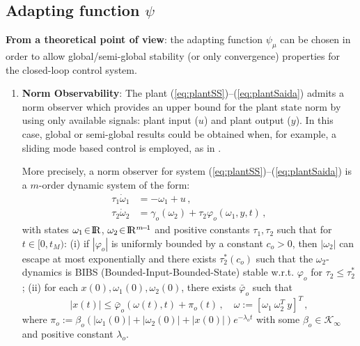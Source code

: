 \documentclass[letterpaper, 10 pt, conference]{ieeeconf}  %
\def\re{{\rm I}\! {\rm R}}
\theoremstyle{plain}
\theoremstyle{definition}
\theoremstyle{remark}
\begin{document}
\begin{footnotesize}
			\subsection{Adapting function $\psi$}
				{\bf From a theoretical point of view}: the adapting function $\psi_\mu$ can be chosen in order to allow global/semi-global stability (or only convergence) properties for the closed-loop control system.			
				\begin{enumerate}
				
				\item {\bf Norm Observability}: The plant
				(\ref{eq:plantSS})--(\ref{eq:plantSaida}) admits a norm observer which provides an upper bound for the plant state norm by using only  available signals: plant input ($u$) and plant output ($y$). In this case, global or semi-global results could be obtained when, for example, a sliding mode based control is employed, as in \cite{POH:2011}.  
				
				
				More precisely, a norm observer for system
				(\ref{eq:plantSS})--(\ref{eq:plantSaida})  is a $m$-order
				dynamic system of the form:
				\begin{align}
				\tau_1 \dot{\omega}_1 &= -\omega_1+u\,, \label{eq:defuav} \\
				\tau_2 \dot{\omega}_2 &=
				\gamma_o(\omega_2)+\tau_2\varphi_o(\omega_1,y,t)\,,\label{eq:normobsgeneric}
				\end{align}
				with states $\omega_1\!\in\!\re$, $\omega_2\!\in\!\re^{m\!-\!1}$ and
				positive constants $\tau_1, \tau_2$ such that for $t\in[0,t_M)$: (i)
				if $|\varphi_o|$ is uniformly bounded by a constant $c_o\!>\!0$,
				then $|\omega_2|$ can escape at most exponentially and there exists
				$\tau_2^*(c_o)$ such that the $\omega_2$-dynamics is BIBS
				(Bounded-Input-Bounded-State) stable w.r.t. $\varphi_o$ for
				$\tau_2\leq \tau_2^*$; (ii)
				for each $x(0),\omega_1(0),\omega_2(0)$, there exists $\bar{\varphi}_o$ such that
				\begin{equation}
				|x(t)| \leq \bar{\varphi}_o(\omega(t),t) + \pi_o(t) \,, \quad
				\omega:=[\omega_1 \ \omega_2^T \ y]^T\,,\label{eq:xboundfromw}
				\end{equation}
				where
				$\pi_o:=\beta_o(|\omega_1(0)|\!+\!|\omega_2(0)|\!+\!|x(0)|)e^{-\lambda_o
				t}$ with some $\beta_o \in \mathcal{K}_\infty$ and positive
				constant $\lambda_o$.
				

\end{enumerate}
\end{footnotesize}
\end{document}
